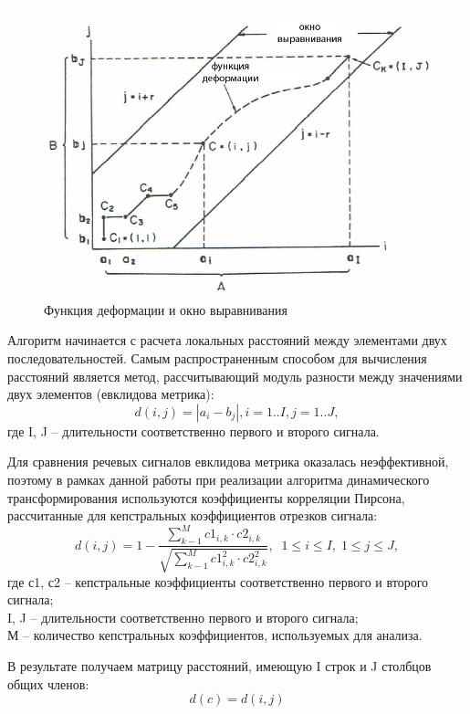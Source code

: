 \documentclass[a4paper,14pt,russian,utf8,nocolumnsxix,nocolumnxxxi,nocolumnxxxii]{eskdtext}
\begin{document}
\begin{figure}[ht]	
	\centering
	\includegraphics[width=120mm]{sakoe1.png}			
	\caption{Функция деформации и окно выравнивания}
	\label{sakoe1}
\end{figure}

Алгоритм начинается с расчета локальных расстояний между элементами двух последовательностей. Самым распространенным способом для вычисления расстояний является метод, рассчитывающий модуль разности между значениями двух элементов (евклидова метрика):
\begin{equation}
	d(i,j)=|a_{i}-b_{j}|, i=1..I, j=1..J, 	
\end{equation}
где I, J – длительности соответственно первого и второго сигнала.

Для сравнения речевых сигналов евклидова метрика оказалась неэффективной, поэтому в рамках данной работы при реализации алгоритма динамического трансформирования используются коэффициенты корреляции Пирсона, рассчитанные для кепстральных коэффициентов отрезков сигнала:
\begin{equation}
	d(i,j)=1-\frac{\sum_{k-1}^{M}c1_{i,k}\cdot c2_{i,k}}{\sqrt{\sum_{k-1}^{M}c1_{i,k}^2 \cdot c2_{i,k}^2}}, \; \; 1 \leq i \leq I, \; 1 \leq j \leq J,
	\label{eq:pirson}
\end{equation}
где с1, с2 – кепстральные коэффициенты соответственно первого и второго сигнала;\\
I, J – длительности соответственно первого и второго сигнала;\\
М – количество кепстральных коэффициентов, используемых для анализа.

В результате получаем матрицу расстояний, имеющую I строк и J столбцов общих членов:
\begin{equation}
	d(c)=d(i,j)
\end{equation}
\end{document}
